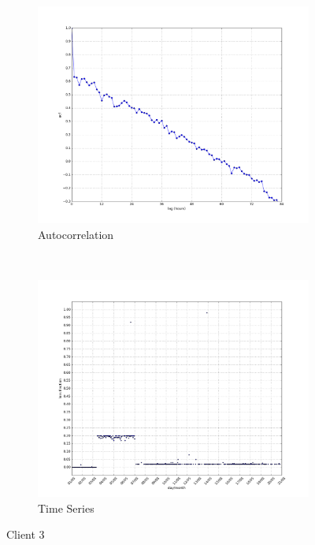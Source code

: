 \begin{figure}[H]
    \centering
    \begin{subfigure}[b]{0.5\textwidth}
        \centering
        \includegraphics[width=1.0\textwidth]{./figures/acf_BHZRENPEV01_64:66:B3:A6:BA:54.png}
        \caption{Autocorrelation}
    \end{subfigure}%
    ~ 
    \begin{subfigure}[b]{0.5\textwidth}
        \centering
        \includegraphics[width=1.0\textwidth]{./figures/ts_BHZRENPEV01_64:66:B3:A6:BA:54.png}
        \caption{Time Series}
    \end{subfigure}
    \caption{Client 3}
    \label{fig:acf_ts_3}
\end{figure}

